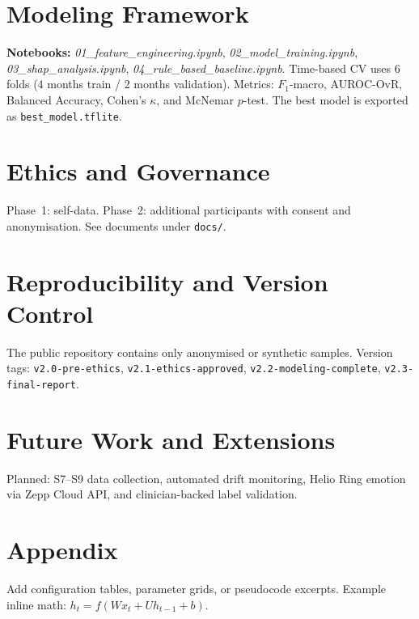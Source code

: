 \documentclass[12pt,a4paper]{article}
\begin{document}
\section{Modeling Framework}
\textbf{Notebooks:} \textit{01\_feature\_engineering.ipynb}, \textit{02\_model\_training.ipynb}, \textit{03\_shap\_analysis.ipynb}, \textit{04\_rule\_based\_baseline.ipynb}. Time-based CV uses 6 folds (4 months train / 2 months validation). Metrics: $F_1$-macro, AUROC-OvR, Balanced Accuracy, Cohen's $\kappa$, and McNemar $p$-test. The best model is exported as \texttt{best\_model.tflite}.

\section{Ethics and Governance}
Phase~1: self-data. 
Phase~2: additional participants with consent and anonymisation. See documents under \texttt{docs/}.

\section{Reproducibility and Version Control}
The public repository contains only anonymised or synthetic samples. Version tags: \texttt{v2.0-pre-ethics}, \texttt{v2.1-ethics-approved}, \texttt{v2.2-modeling-complete}, \texttt{v2.3-final-report}.

\section{Future Work and Extensions}
Planned: S7--S9 data collection, automated drift monitoring, Helio Ring emotion via Zepp Cloud API, and clinician-backed label validation.

\appendix
\section{Appendix}
Add configuration tables, parameter grids, or pseudocode excerpts. Example inline math: $h_t = f(Wx_t + Uh_{t-1} + b)$.
\end{document}
